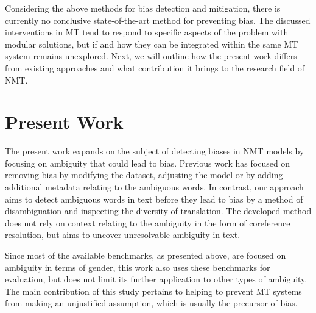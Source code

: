 \newpage

Considering the above methods for bias detection and mitigation, there is currently no conclusive state-of-the-art method for preventing bias. The discussed interventions in MT tend to respond to specific aspects of the problem with modular solutions, but if and how they can be integrated within the same MT system remains unexplored. Next, we will outline how the present work differs from existing approaches and what contribution it brings to the research field of NMT.

 



\section{Present Work}
\label{sec:Related_work:Present_work}

The present work expands on the subject of detecting biases in NMT models by focusing on ambiguity that could lead to bias. Previous work has focused on removing bias by modifying the dataset, adjusting the model or by adding additional metadata relating to the ambiguous words. In contrast, our approach aims to detect ambiguous words in text before they lead to bias by a method of disambiguation and inspecting the diversity of translation. The developed method does not rely on context relating to the ambiguity in the form of coreference resolution, but aims to uncover unresolvable ambiguity in text. 

Since most of the available benchmarks, as presented above, are focused on ambiguity in terms of gender, this work also uses these benchmarks for evaluation, but does not limit its further application to other types of ambiguity. The main contribution of this study pertains to helping to prevent MT systems from making an unjustified assumption, which is usually the precursor of bias.

